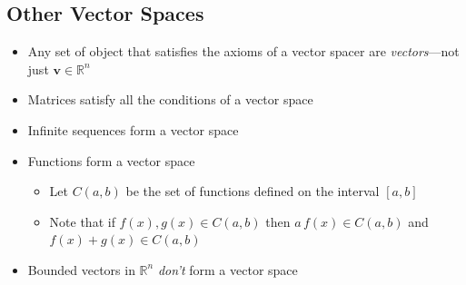\begin{slide}
\section{Other Vector Spaces}

\begin{PauseHighLight}
  \begin{itemize}
  \item Any set of object that satisfies the axioms of a vector spacer
    are \textit{vectors}\pause---not just $\bm{v}\in \mathbb{R}^n$\pauseb
  \item Matrices satisfy all the conditions of a vector space\pause
  \item Infinite sequences form a vector space\pause
  \item Functions form a vector space\pause
    \begin{itemize}\squeeze
    \item Let $C(a,b)$ be the set of functions defined on the interval
      $[a,b]$
    \item Note that if $f(x), g(x) \in C(a,b)$ then $a\,f(x) \in C(a,b)$
      and $f(x)+g(x) \in C(a,b)$\pause
    \end{itemize}
  \item Bounded vectors in $\mathbb{R}^n$ \emph{don't} form a vector space\pause
  \end{itemize}
\end{PauseHighLight}

\end{slide}

\Outline

